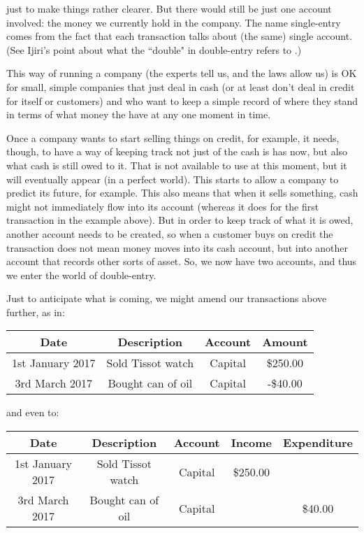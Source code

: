 \documentclass[11pt]{amsart}
\begin{document}
\noindent just to make things rather clearer. But there would still be just one account involved: the money we currently hold in the company. The name single-entry comes from the fact that each transaction talks about (the same) single account. (See Ijiri's point about what the ``double" in double-entry refers to \cite{}.)

This way of running a company (the experts tell us, and the laws allow us) is OK for small, simple companies that just deal in cash (or at least don't deal in credit for itself or customers) and who want to keep a simple record of where they stand in terms of what money the have at any one moment in time. 

Once a company wants to start selling things on credit, for example, it needs, though, to have a way of keeping track not just of the cash is has now, but also what cash is still owed to it. That is not available to use at this moment, but it will eventually appear (in a perfect world). This starts to allow a company to predict its future, for example. This also means that  when it sells something, cash might not immediately flow into its account (whereas it does for the first transaction in the example above). But in order to keep track of what it is owed, another account needs to be created, so when a customer buys on credit the transaction does not mean money moves into its cash account, but into another account that records other sorts of asset. So, we now have two accounts, and thus we enter the world of double-entry.

Just to anticipate what is coming, we might amend our transactions above further, as in:

\begin{table}[h]
\begin{center}
\begin{tabular}{|c|c|c|c|}
Date & Description  & Account & Amount\\
\hline \hline
1st January 2017 & Sold Tissot watch  & Capital & \$250.00\\
\hline
3rd March 2017 &  Bought can of oil   & Capital & -\$40.00
\end{tabular}
\end{center}
\label{default}
\end{table}%

and even to:

\begin{table}[h]
\begin{center}
\begin{tabular}{|c|c|c|c|c|}
Date & Description & Account & Income & Expenditure \\
\hline \hline
1st January 2017 & Sold Tissot watch & Capital & \$250.00 & \\
\hline
3rd March 2017 &  Bought can of oil & Capital & & \$40.00
\end{tabular}
\end{center}
\label{default}
\end{table}%
\end{document}
